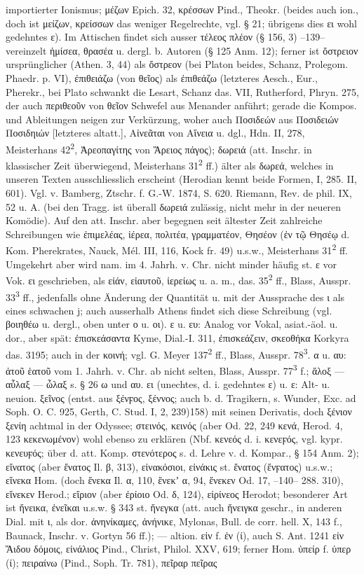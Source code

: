 importierter Ionismus; μέζων Epich. 32, κρέσσων Pind., Theokr. (beides auch ion., doch ist μείζων, κρείσσων das weniger Regelrechte, vgl. § 21; übrigens dies ει wohl gedehntes ε). Im Attischen findet sich ausser τέλεος πλέον (§ 156, 3) --139-- vereinzelt ἡμίσεα, θρασέα u. dergl. b. Autoren (§ 125 Anm. 12); ferner ist ὄστρειον ursprünglicher (Athen. 3, 44) als ὄστρεον (bei Platon beides, Schanz, Prolegom. Phaedr. p. VI), ἐπιθειάζω (von θεῖος) als ἐπιθεάζω (letzteres Aesch., Eur., Pherekr., bei Plato schwankt die Lesart, Schanz das. VII, Rutherford, Phryn. 275, der auch περιθεοῦν von θεῖον Schwefel aus Menander anführt; gerade die Kompos. und Ableitungen neigen zur Verkürzung, woher auch Ποσιδεών aus Ποσιδειών Ποσιδηιών [letzteres altatt.], Αἰνεᾶται von Αἴνεια u. dgl., Hdn. II, 278, Meisterhans 42\textsuperscript{2}, Ἀρεοπαγίτης von Ἄρειος πάγος); δωρειά (att. Inschr. in klassischer Zeit überwiegend, Meisterhans 31\textsuperscript{2} ff.) älter als δωρεά, welches in unseren Texten ausschliesslich erscheint (Herodian kennt beide Formen, I, 285. II, 601). Vgl. v. Bamberg, Ztschr. f. G.-W. 1874, S. 620. Riemann, Rev. de phil. IX, 52 u. A. (bei den Tragg. ist überall δωρειά zulässig, nicht mehr in der neueren Komödie). Auf den att. Inschr. aber begegnen seit ältester Zeit zahlreiche Schreibungen wie ἐπιμελέας, ἱέρεα, πολιτέα, γραμματέον, Θησέον (ἐν τῷ Θησέῳ d. Kom. Pherekrates, Nauck, Mél. III, 116, Kock fr. 49) u.s.w., Meisterhans 31\textsuperscript{2} ff. Umgekehrt aber wird nam. im 4. Jahrh. v. Chr. nicht minder häufig st. ε vor Vok. ει geschrieben, als εἰάν, εἱαυτοῦ, ἱερείως u. a. m., das. 35\textsuperscript{2} ff., Blass, Ausspr. 33\textsuperscript{3} ff., jedenfalls ohne Änderung der Quantität u. mit der Aussprache des ι als eines schwachen j; auch ausserhalb Athens findet sich diese Schreibung (vgl. βοιηθέω u. dergl., oben unter ο u. οι). ε u. ευ: Analog vor Vokal, asiat.-äol. u. dor., aber spät: ἐπισκεάσαντα Kyme, Dial.-I. 311, ἐπισκεάζειν, σκεοθήκα Korkyra das. 3195; auch in der κοινή; vgl. G. Meyer 137\textsuperscript{2} ff., Blass, Ausspr. 78\textsuperscript{3}. α u. αυ: ἀτοῦ ἑατοῦ vom 1. Jahrh. v. Chr. ab nicht selten, Blass, Ausspr. 77\textsuperscript{3} f.; ἄλοξ — αὖλαξ — ὦλαξ s. § 26 ω und αυ. ει (unechtes, d. i. gedehntes ε) u. ε: Alt- u. neuion. ξεῖνος (entst. aus ξένϝος, ξέννος; auch b. d. Tragikern, s. Wunder, Exc. ad Soph. O. C. 925, Gerth, C. Stud. I, 2, 239)158) mit seinen Derivatis, doch ξένιον ξενίη achtmal in der Odyssee; στεινός, κεινός (aber Od. 22, 249 κενά, Herod. 4, 123 κεκενωμένον) wohl ebenso zu erklären (Nbf. κενεός d. i. κενεϝός, vgl. kypr. κενευϝός; über d. att. Komp. στενότερος s. d. Lehre v. d. Kompar., § 154 Anm. 2); εἴνατος (aber ἔνατος Il. β, 313), εἰνακόσιοι, εἰνάκις st. ἔνατος (ἔνϝατος) u.s.w.; εἵνεκα Hom. (doch ἕνεκα Il. α, 110, ἕνεκʼ α, 94, ἕνεκεν Od. 17, --140-- 288. 310), εἵνεκεν Herod.; εἴριον (aber ἐρίοιο Od. δ, 124), εἰρίνεος Herodot; besonderer Art ist ἤνεικα, ἐνεῖκαι u.s.w. § 343 st. ἤνεγκα (att. auch ἤνειγκα geschr., in anderen Dial. mit ι, als dor. ἀνηνίκαμες, ἀνήνικε, Mylonas, Bull. de corr. hell. X, 143 f., Baunack, Inschr. v. Gortyn 56 ff.); — altion. εἰν f. ἐν (ί), auch S. Ant. 1241 εἰν Ἅιδου δόμοις, εἰνάλιος Pind., Christ, Philol. XXV, 619; ferner Hom. ὑπείρ f. ὑπερ (ί); πειραίνω (Pind., Soph. Tr. 781), πεῖραρ πεῖρας 